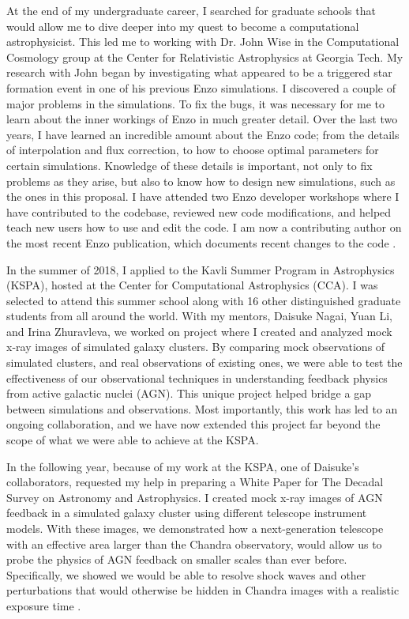 \documentclass{article}
\begin{document}
At the end of my undergraduate career, I searched for graduate schools that would allow me to dive deeper into my quest to become a computational astrophysicist. This led me to working with Dr. John Wise in the Computational Cosmology group at the Center for Relativistic Astrophysics at Georgia Tech. My research with John began by investigating what appeared to be a triggered star formation event in one of his previous Enzo simulations. I discovered a couple of major problems in the simulations. To fix the bugs, it was necessary for me to learn about the inner workings of Enzo in much greater detail. Over the last two years, I have learned an incredible amount about the Enzo code; from the details of interpolation and flux correction, to how to choose optimal parameters for certain simulations. Knowledge of these details is important, not only to fix problems as they arise, but also to know how to design new simulations, such as the ones in this proposal. I have attended two Enzo developer workshops where I have contributed to the codebase, reviewed new code modifications, and helped teach new users how to use and edit the code. I am now a contributing author on the most recent Enzo publication, which documents recent changes to the code \citep{ENZO2019_JOSS}.

In the summer of 2018, I applied to the Kavli Summer Program in Astrophysics (KSPA), hosted at the Center for Computational Astrophysics (CCA). I was selected to attend this summer school along with 16 other distinguished graduate students from all around the world. With my mentors, Daisuke Nagai, Yuan Li, and Irina Zhuravleva, we worked on project where I created and analyzed mock x-ray images of simulated galaxy clusters. By comparing mock observations of simulated clusters, and real observations of existing ones, we were able to test the effectiveness of our observational techniques in understanding feedback physics from active galactic nuclei (AGN). This unique project helped bridge a gap between simulations and observations. Most importantly, this work has led to an ongoing collaboration, and we have now extended this project far beyond the scope of what we were able to achieve at the KSPA. 

In the following year, because of my work at the KSPA, one of Daisuke's collaborators, requested my help in preparing a White Paper for The Decadal Survey on Astronomy and Astrophysics. I created mock x-ray images of AGN feedback in a simulated galaxy cluster using different telescope instrument models. With these images, we demonstrated how a next-generation telescope with an effective area larger than the Chandra observatory, would allow us to probe the physics of AGN feedback on smaller scales than ever before. Specifically, we showed we would be able to resolve shock waves and other perturbations that would otherwise be hidden in Chandra images with a realistic exposure time \citep{WP_Ruszkowski2019}. 
\end{document}

